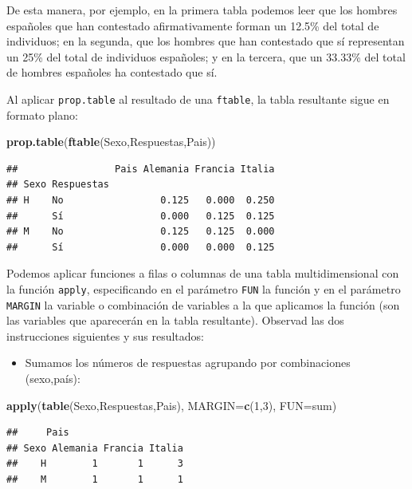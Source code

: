 \documentclass[]{book}
\newenvironment{Shaded}{\begin{snugshade}}{\end{snugshade}}
\newcommand{\DataTypeTok}[1]{\textcolor[rgb]{0.13,0.29,0.53}{#1}}
\newcommand{\DecValTok}[1]{\textcolor[rgb]{0.00,0.00,0.81}{#1}}
\newcommand{\KeywordTok}[1]{\textcolor[rgb]{0.13,0.29,0.53}{\textbf{#1}}}
\newcommand{\NormalTok}[1]{#1}
\providecommand{\tightlist}{%
  \setlength{\itemsep}{0pt}\setlength{\parskip}{0pt}}
\theoremstyle{definition}
\theoremstyle{definition}
\theoremstyle{definition}
\theoremstyle{remark}
\begin{document}
De esta manera, por ejemplo, en la primera tabla podemos leer que los hombres españoles que han contestado afirmativamente forman un
12.5\% del total de individuos; en la segunda, que los hombres que han contestado que sí representan un 25\% del total de individuos españoles; y en la tercera, que un 33.33\% del total de hombres españoles ha contestado que sí.

Al aplicar \texttt{prop.table} al resultado de una \texttt{ftable}, la tabla resultante sigue en formato plano:

\begin{Shaded}
\begin{Highlighting}[]
\KeywordTok{prop.table}\NormalTok{(}\KeywordTok{ftable}\NormalTok{(Sexo,Respuestas,Pais)) }
\end{Highlighting}
\end{Shaded}

\begin{verbatim}
##                 Pais Alemania Francia Italia
## Sexo Respuestas                             
## H    No                 0.125   0.000  0.250
##      Sí                 0.000   0.125  0.125
## M    No                 0.125   0.125  0.000
##      Sí                 0.000   0.000  0.125
\end{verbatim}

Podemos aplicar funciones a filas o columnas de una tabla multidimensional con la función \texttt{apply}, especificando en el parámetro \texttt{FUN} la función y en el parámetro \texttt{MARGIN} la variable o combinación de variables a la que aplicamos la función (son las variables que aparecerán en la tabla resultante). Observad las dos instrucciones siguientes y sus resultados:

\begin{itemize}
\tightlist
\item
  Sumamos los números de respuestas agrupando por combinaciones (sexo,país):
\end{itemize}

\begin{Shaded}
\begin{Highlighting}[]
\KeywordTok{apply}\NormalTok{(}\KeywordTok{table}\NormalTok{(Sexo,Respuestas,Pais), }\DataTypeTok{MARGIN=}\KeywordTok{c}\NormalTok{(}\DecValTok{1}\NormalTok{,}\DecValTok{3}\NormalTok{), }\DataTypeTok{FUN=}\NormalTok{sum)}
\end{Highlighting}
\end{Shaded}

\begin{verbatim}
##     Pais
## Sexo Alemania Francia Italia
##    H        1       1      3
##    M        1       1      1
\end{verbatim}
\end{document}
